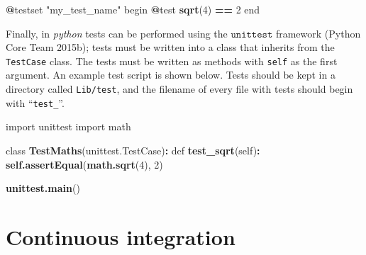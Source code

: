 \documentclass[
]{article}
\newenvironment{Shaded}{\begin{snugshade}}{\end{snugshade}}
\newcommand{\DecValTok}[1]{\textcolor[rgb]{0.00,0.00,0.81}{#1}}
\newcommand{\KeywordTok}[1]{\textcolor[rgb]{0.13,0.29,0.53}{\textbf{#1}}}
\newcommand{\NormalTok}[1]{#1}
\newcommand{\OperatorTok}[1]{\textcolor[rgb]{0.81,0.36,0.00}{\textbf{#1}}}
\newcommand{\StringTok}[1]{\textcolor[rgb]{0.31,0.60,0.02}{#1}}
\begin{document}
\begin{Shaded}
\begin{Highlighting}[]
\OperatorTok{@}\NormalTok{testset }\StringTok{"my_test_name"}\NormalTok{ begin}
  \OperatorTok{@}\NormalTok{test }\KeywordTok{sqrt}\NormalTok{(}\DecValTok{4}\NormalTok{) }\OperatorTok{==}\StringTok{ }\DecValTok{2}
\NormalTok{end}
\end{Highlighting}
\end{Shaded}

Finally, in \emph{python} tests can be performed using the \(\texttt{unittest}\) framework (Python Core Team 2015b); tests must be written into a class that inherits from the \texttt{TestCase} class.
The tests must be written as methods with \texttt{self} as the first argument.
An example test script is shown below.
Tests should be kept in a directory called \texttt{Lib/test}, and the filename of every file with tests should begin with ``\texttt{test\_}''.
\newline
{}\label{testpy}

\begin{Shaded}
\begin{Highlighting}[]
\NormalTok{import unittest}
\NormalTok{import math}

\NormalTok{class }\KeywordTok{TestMaths}\NormalTok{(unittest.TestCase)}\OperatorTok{:}
\StringTok{    }\NormalTok{def }\KeywordTok{test_sqrt}\NormalTok{(self)}\OperatorTok{:}
\StringTok{        }\KeywordTok{self.assertEqual}\NormalTok{(}\KeywordTok{math.sqrt}\NormalTok{(}\DecValTok{4}\NormalTok{), }\DecValTok{2}\NormalTok{)}

\KeywordTok{unittest.main}\NormalTok{()}
\end{Highlighting}
\end{Shaded}

\hypertarget{ci}{%
\section{Continuous integration}\label{ci}}
\end{document}
